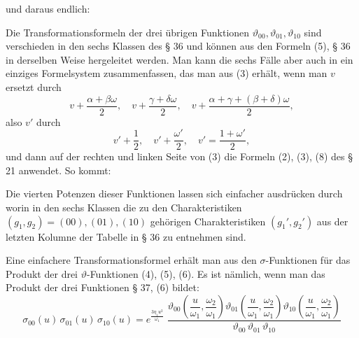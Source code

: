 und daraus endlich:

Die Transformationsformeln der drei übrigen Funktionen $\vartheta_{00}, \vartheta_{01}, \vartheta_{10}$ sind verschieden in den sechs Klassen des § 36 und können aus den Formeln (5), § 36 in derselben Weise hergeleitet werden. Man kann die sechs Fälle aber auch in ein einziges Formelsystem zusammenfassen, das man aus (3) erhält, wenn man $v$ ersetzt durch
\[
v+\frac{\alpha+\beta\omega}{2}, \quad v+\frac{\gamma+\delta\omega}{2}, \quad v+\frac{\alpha+\gamma+(\beta+\delta)\omega}{2},
\]
also $v'$ durch
\[
v'+\frac{1}{2}, \quad v'+\frac{\omega'}{2}, \quad v' = \frac{1+\omega'}{2},
\]
und dann auf der rechten und linken Seite von (3) die Formeln (2), (3), (8) des § 21 anwendet. So kommt:

Die vierten Potenzen dieser Funktionen lassen sich einfacher ausdrücken durch
worin in den sechs Klassen die zu den Charakteristiken $(g_1,g_2)=(00),(01),(10)$ gehörigen Charakteristiken $(g_1',g_2')$ aus der letzten Kolumne der Tabelle in § 36 zu entnehmen sind.

Eine einfachere Transformationsformel erhält man aus den $\sigma$-Funktionen für das Produkt der drei $\vartheta$-Funktionen (4), (5), (6). Es ist nämlich, wenn man das Produkt der drei Funktionen § 37, (6) bildet:
\[
\sigma_{00}(u)\,\sigma_{01}(u)\,\sigma_{10}(u)
= e^{\frac{3\eta_1 u^2}{\omega_1}}\; \frac{\vartheta_{00}\!\left(\dfrac{u}{\omega_1}, \dfrac{\omega_2}{\omega_1}\right)\vartheta_{01}\!\left(\dfrac{u}{\omega_1}, \dfrac{\omega_2}{\omega_1}\right)\vartheta_{10}\!\left(\dfrac{u}{\omega_1}, \dfrac{\omega_2}{\omega_1}\right)}{\vartheta_{00}\,\vartheta_{01}\,\vartheta_{10}}
\]
